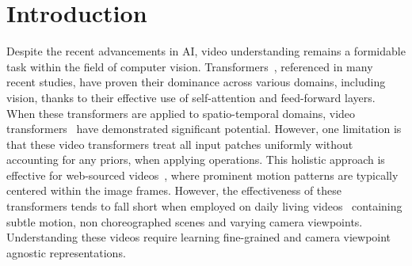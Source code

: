 \documentclass{article}
\begin{document}
\section{Introduction}
Despite the recent advancements in AI, video understanding remains a formidable task within the field of computer vision.
Transformers~\cite{attention, dosovitskiy2020vit, deit, crossvit, t2t, tnt}, referenced in many recent studies, have proven their dominance across various domains, including vision, thanks to their effective use of self-attention and feed-forward layers. When these transformers are applied to spatio-temporal domains, video transformers~\cite{timesformer, vivit, liu2021videoswin, motionformerNeurIPS21, mvit1} have demonstrated significant potential. However, one limitation is that these video transformers treat all input patches uniformly without accounting for any priors, when applying operations.
This holistic approach is effective for web-sourced videos~\cite{kinetics, caba2015activitynet, ucf,  kuehne2011hmdb}, where prominent motion patterns are typically centered within the image frames. However, the effectiveness of these transformers tends to fall short when employed on daily living videos~\cite{ntu120, NTU_RGB+D, smarthome, MSRDailyactivity3D, nucla} containing subtle motion, non choreographed scenes and varying camera viewpoints. Understanding these videos require learning fine-grained and camera viewpoint agnostic representations.
\end{document}
